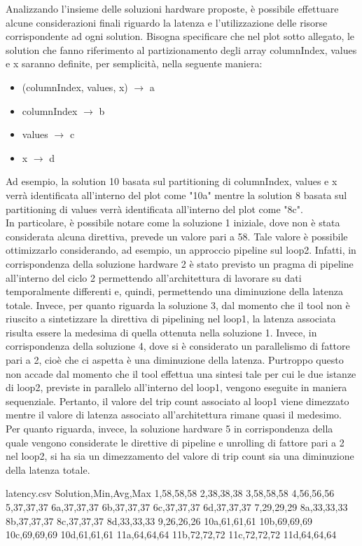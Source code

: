 Analizzando l'insieme delle soluzioni hardware proposte, è possibile effettuare alcune considerazioni finali riguardo la latenza e l'utilizzazione delle risorse corrispondente ad ogni solution. Bisogna specificare che nel plot sotto allegato, le solution che fanno riferimento al partizionamento degli array columnIndex, values e x saranno definite, per semplicità, nella seguente maniera:
\begin{itemize}
	\item (columnIndex, values, x) $\rightarrow$ a
	\item columnIndex $\rightarrow$ b
	\item values $\rightarrow$ c
	\item x $\rightarrow$ d
\end{itemize} 
Ad esempio, la solution 10 basata sul partitioning di columnIndex, values e x verrà identificata all'interno del plot come "10a" mentre la solution 8 basata sul partitioning di values verrà identificata all'interno del plot come "8c".
\\
In particolare, è possibile notare come la soluzione 1 iniziale, dove non è stata considerata alcuna direttiva, prevede un valore pari a 58. Tale valore è possibile ottimizzarlo considerando, ad esempio, un approccio pipeline sul loop2. Infatti, in corrispondenza della soluzione hardware 2 è stato previsto un pragma di pipeline all'interno del ciclo 2 permettendo all'architettura di lavorare su dati temporalmente differenti e, quindi, permettendo una diminuzione della latenza totale. Invece, per quanto riguarda la soluzione 3, dal momento che il tool non è riuscito a sintetizzare la direttiva di pipelining nel loop1, la latenza associata risulta essere la medesima di quella ottenuta nella soluzione 1. Invece, in corrispondenza della soluzione 4, dove si è considerato un parallelismo di fattore pari a 2, cioè che ci aspetta è una diminuzione della latenza. Purtroppo questo non accade dal momento che il tool effettua una sintesi tale per cui le due istanze di loop2, previste in parallelo all'interno del loop1, vengono eseguite in maniera sequenziale. Pertanto, il valore del trip count associato al loop1 viene dimezzato mentre il valore di latenza associato all'architettura rimane quasi il medesimo. Per quanto riguarda, invece, la soluzione hardware 5 in corrispondenza della quale vengono considerate le direttive di pipeline e unrolling di fattore pari a 2 nel loop2, si ha sia un dimezzamento del valore di trip count sia una diminuzione della latenza totale.

\begin{filecontents*}{latency.csv}
	Solution,Min,Avg,Max
	1,58,58,58
	2,38,38,38
	3,58,58,58
	4,56,56,56
	5,37,37,37
	6a,37,37,37
	6b,37,37,37
	6c,37,37,37
	6d,37,37,37
	7,29,29,29
	8a,33,33,33
	8b,37,37,37
	8c,37,37,37
	8d,33,33,33
	9,26,26,26
	10a,61,61,61
	10b,69,69,69
	10c,69,69,69
	10d,61,61,61
	11a,64,64,64
	11b,72,72,72
	11c,72,72,72
	11d,64,64,64
\end{filecontents*}

